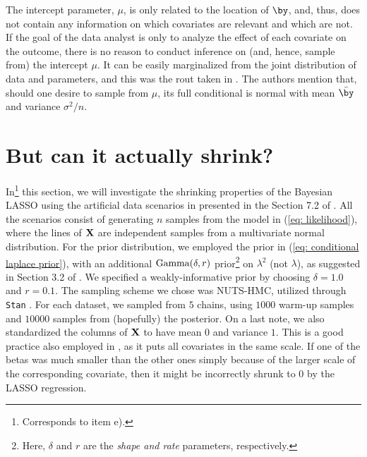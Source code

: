 \documentclass[a4paper, 10pt]{article}
\begin{document}
The intercept parameter, $ \mu $, is only related to the location of $ \by $, and, thus, does not contain any information on which covariates are relevant and which are not.
If the goal of the data analyst is only to analyze the effect of each covariate on the outcome, there is no reason to conduct inference on (and, hence, sample from) the intercept $ \mu $.
It can be easily marginalized from the joint distribution of data and parameters, and this was the rout taken in \cite{parkcasella2008bayesianlasso}.
The authors mention that, should one desire to sample from $ \mu $, its full conditional is normal with mean $ \bar{ \by } $ and variance $ \sigma^2/n $.



\section{But can it actually shrink?}
In\footnote{Corresponds to item e).} this section, we will investigate the shrinking properties of the Bayesian LASSO using the artificial data scenarios in presented in the Section 7.2 of \cite{tibshirani1994lasso}.
All the scenarios consist of generating $ n $ samples from the model in (\ref{eq: likelihood}), where the lines of $ \mathbf{X} $ are independent samples from a multivariate normal distribution.
For the prior distribution, we employed the prior in (\ref{eq: conditional laplace prior}), with an additional $ \operatorname{Gamma} (\delta, r) $ prior\footnote{Here, $ \delta $ and $ r $ are the \emph{shape and rate} parameters, respectively.} on $ \lambda^2 $ (not $\lambda$), as suggested in Section 3.2 of \cite{parkcasella2008bayesianlasso}.
We specified a weakly-informative prior by choosing $ \delta = 1.0 $ and $ r = 0.1 $.
The sampling scheme we chose was NUTS-HMC, utilized through \texttt{Stan} \cite{stan2024}.
For each dataset, we sampled from $ 5 $ chains, using $ 1000 $ warm-up samples and $ 10 000 $ samples from (hopefully) the posterior.
On a last note, we also standardized the columns of $ \mathbf{X} $ to have mean $ 0 $ and variance $ 1 $.
This is a good practice also employed in \cite{parkcasella2008bayesianlasso}, as it puts all covariates in the same scale.
If one of the betas was much smaller than the other ones simply because of the larger scale of the corresponding covariate, then it might be incorrectly shrunk to $ 0 $ by the LASSO regression.
\end{document}
